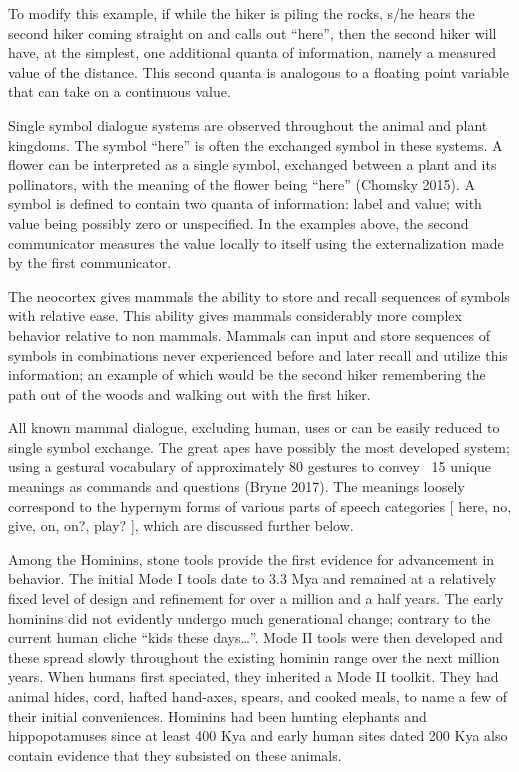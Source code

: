 \documentclass{clv3}
\begin{document}
To modify this example,  if while the hiker is piling the rocks,  s/he hears the second hiker coming straight on and calls out “here”,  then the second hiker will have,  at the simplest,  one additional quanta of information, namely a measured value of the distance.  This second quanta is analogous to a  floating point variable that can take on a continuous value. 

Single symbol dialogue systems are observed throughout the animal and plant kingdoms.  The symbol “here” is often the exchanged symbol in these systems.  A flower can be interpreted as a single symbol, exchanged between a plant and its pollinators, with the meaning of the flower being “here” (Chomsky 2015).   A symbol is defined to contain two quanta of information: label and value; with value being possibly zero or unspecified.   In the examples above, the second communicator measures the value locally to itself using the externalization made by the first communicator.

The neocortex gives mammals the ability to store and recall sequences of symbols  with relative ease.  This ability gives mammals considerably more complex behavior relative to non mammals.  Mammals can input and store sequences of symbols in combinations never experienced before and later recall and utilize this information; an example of which would be the second hiker remembering the path out of the woods and walking out with the first hiker.

All known mammal dialogue, excluding human, uses or can be easily reduced to single symbol exchange.    The great apes have possibly the most developed system;  using a gestural vocabulary of approximately 80 gestures to convey ~15 unique meanings as commands and questions (Bryne 2017).  The meanings loosely correspond to the hypernym forms of various parts of speech categories    [ here, no, give, on, on?, play? ], which are discussed further below.  

Among the Hominins, stone tools provide the first evidence for advancement in behavior.   The initial Mode I tools date to 3.3 Mya and remained at a relatively fixed level of design and refinement for over a million and a half years.  The early hominins did not evidently undergo much generational change; contrary to the current human cliche “kids these days…”.    Mode II tools were then developed and these spread slowly throughout the existing hominin range over the next million years.   When humans first speciated, they inherited a Mode II toolkit.  They had animal hides, cord, hafted hand-axes, spears, and cooked meals, to name a few of their initial conveniences.  Hominins had been hunting elephants and hippopotamuses since at least 400 Kya and early human sites dated 200 Kya also contain evidence that they subsisted on these animals.   
\end{document}
